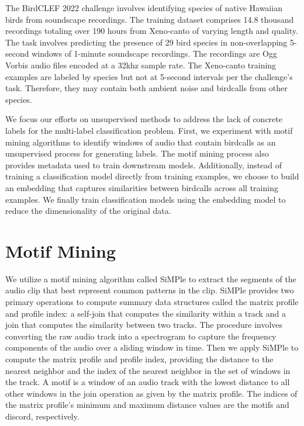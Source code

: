 \documentclass[
]{ceurart}
\begin{document}
The BirdCLEF 2022 challenge \cite{kahl2022overview} \cite{lifeclef2022} involves identifying species of native Hawaiian birds from soundscape recordings. The training dataset comprises 14.8 thousand recordings totaling over 190 hours from Xeno-canto \cite{xeno-canto} of varying length and quality. The task involves predicting the presence of 29 bird species in non-overlapping 5-second windows of 1-minute soundscape recordings. The recordings are Ogg Vorbis audio files encoded at a 32khz sample rate. The Xeno-canto training examples are labeled by species but not at 5-second intervals per the challenge's task. Therefore, they may contain both ambient noise and birdcalls from other species.

We focus our efforts on unsupervised methods to address the lack of concrete labels for the multi-label classification problem. First, we experiment with motif mining algorithms to identify windows of audio that contain birdcalls as an unsupervised process for generating labels. The motif mining process also provides metadata used to train downstream models. Additionally, instead of training a classification model directly from training examples, we choose to build an embedding that captures similarities between birdcalls across all training examples. We finally train classification models using the embedding model to reduce the dimensionality of the original data.

\section{Motif Mining}

We utilize a motif mining algorithm called SiMPle \cite{silva2018fast} to extract the segments of the audio clip that best represent common patterns in the clip. SiMPle provides two primary operations to compute summary data structures called the matrix profile and profile index: a self-join that computes the similarity within a track and a join that computes the similarity between two tracks. The procedure involves converting the raw audio track into a spectrogram to capture the frequency components of the audio over a sliding window in time. Then we apply SiMPle to compute the matrix profile and profile index, providing the distance to the nearest neighbor and the index of the nearest neighbor in the set of windows in the track. A motif is a window of an audio track with the lowest distance to all other windows in the join operation as given by the matrix profile. The indices of the matrix profile's minimum and maximum distance values are the motifs and discord, respectively.
\end{document}
